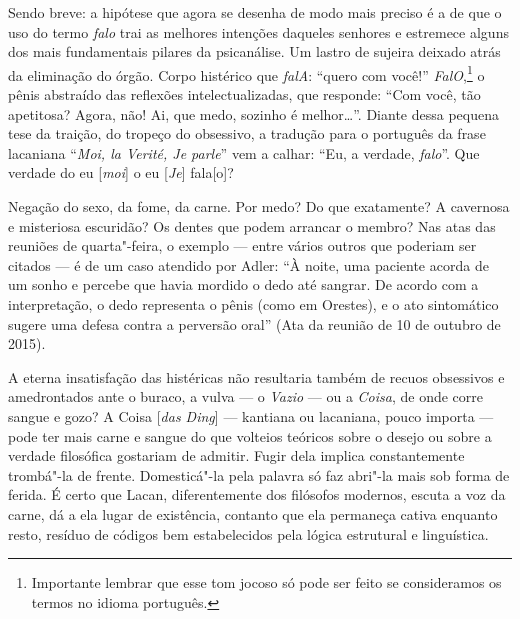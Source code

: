 Sendo breve: a hipótese que agora se desenha de modo mais preciso é a de
que o uso do termo \emph{falo} trai as melhores intenções daqueles
senhores e estremece alguns dos mais fundamentais pilares da
psicanálise. Um lastro de sujeira deixado atrás da eliminação do órgão.
Corpo histérico que \emph{falA}: ``quero com você!''
\emph{FalO},\footnote{Importante lembrar que esse tom jocoso só pode ser
  feito se consideramos os termos no idioma português.} o pênis
abstraído das reflexões intelectualizadas, que responde: ``Com você, tão
apetitosa? Agora, não! Ai, que medo, sozinho é melhor\ldots{}''. Diante dessa
pequena tese da traição, do tropeço do obsessivo, a tradução para o
português da frase lacaniana ``\emph{Moi, la Verité, Je parle}'' vem a
calhar: ``Eu, a verdade, \emph{falo}''. Que verdade do eu
{[}\emph{moi}{]} o eu {[}\emph{Je}{]} fala{[}o{]}?

Negação do sexo, da fome, da carne. Por medo? Do que exatamente? A
cavernosa e misteriosa escuridão? Os dentes que podem arrancar o membro?
Nas atas das reuniões de quarta"-feira, o exemplo --- entre vários outros
que poderiam ser citados --- é de um caso atendido por Adler: ``À noite,
uma paciente acorda de um sonho e percebe que havia mordido o dedo até
sangrar. De acordo com a interpretação, o dedo representa o pênis (como
em Orestes), e o ato sintomático sugere uma defesa contra a perversão
oral'' (Ata da reunião de 10 de outubro de 2015).

A eterna insatisfação das histéricas não resultaria também de recuos
obsessivos e amedrontados ante o buraco, a vulva --- o \emph{Vazio} --- ou
a \emph{Coisa}, de onde corre sangue e gozo? A Coisa {[}\emph{das
Ding}{]} --- kantiana ou lacaniana, pouco importa --- pode ter mais carne
e sangue do que volteios teóricos sobre o desejo ou sobre a verdade
filosófica gostariam de admitir. Fugir dela implica constantemente
trombá"-la de frente. Domesticá"-la pela palavra só faz abri"-la mais sob
forma de ferida. É certo que Lacan, diferentemente dos filósofos
modernos, escuta a voz da carne, dá a ela lugar de existência, contanto
que ela permaneça cativa enquanto resto, resíduo de códigos bem
estabelecidos pela lógica estrutural e linguística.


